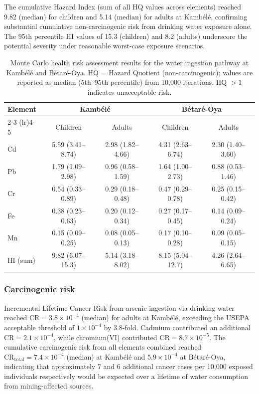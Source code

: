 \documentclass[preprint,12pt,authoryear]{elsarticle}
\begin{document}
The cumulative Hazard Index (sum of all HQ values across elements) reached 9.82 (median) for children and 5.14 (median) for adults at Kamb\'{e}l\'{e}, confirming substantial cumulative non-carcinogenic risk from drinking water exposure alone. The 95th percentile HI values of 15.3 (children) and 8.2 (adults) underscore the potential severity under reasonable worst-case exposure scenarios.

\begin{table}[h!]
\centering
\caption{Monte Carlo health risk assessment results for the water ingestion pathway at Kamb\'{e}l\'{e} and B\'{e}tar\'{e}-Oya. HQ = Hazard Quotient (non-carcinogenic); values are reported as median (5th--95th percentile) from 10,000 iterations. HQ $> 1$ indicates unacceptable risk.}
\label{tab:hq}
\small
\begin{tabular}{lcccc}
\toprule
\multirow{2}{*}{Element} & \multicolumn{2}{c}{Kamb\'{e}l\'{e}} & \multicolumn{2}{c}{B\'{e}tar\'{e}-Oya} \\
\cmidrule(lr){2-3} \cmidrule(lr){4-5}
& Children & Adults & Children & Adults \\
\midrule
Cd & 5.59 (3.41--8.74) & 2.98 (1.82--4.66) & 4.31 (2.63--6.74) & 2.30 (1.40--3.60) \\
Pb & 1.79 (1.09--2.98) & 0.96 (0.58--1.59) & 1.64 (1.00--2.73) & 0.88 (0.53--1.46) \\
Cr & 0.54 (0.33--0.89) & 0.29 (0.18--0.48) & 0.47 (0.29--0.78) & 0.25 (0.15--0.42) \\
Fe & 0.38 (0.23--0.63) & 0.20 (0.12--0.34) & 0.27 (0.17--0.45) & 0.14 (0.09--0.24) \\
Mn & 0.15 (0.09--0.25) & 0.08 (0.05--0.13) & 0.17 (0.10--0.28) & 0.09 (0.05--0.15) \\
\midrule
HI (sum) & 9.82 (6.07--15.3) & 5.14 (3.18--8.02) & 8.15 (5.04--12.7) & 4.26 (2.64--6.65) \\
\bottomrule
\end{tabular}
\end{table}

\subsubsection{Carcinogenic risk}

Incremental Lifetime Cancer Risk from arsenic ingestion via drinking water reached $\text{CR} = 3.8 \times 10^{-4}$ (median) for adults at Kamb\'{e}l\'{e}, exceeding the USEPA acceptable threshold of $1 \times 10^{-4}$ by 3.8-fold. Cadmium contributed an additional $\text{CR} = 2.1 \times 10^{-4}$, while chromium(VI) contributed $\text{CR} = 8.7 \times 10^{-5}$. The cumulative carcinogenic risk from all elements combined reached $\text{CR}_\text{total} = 7.4 \times 10^{-4}$ (median) at Kamb\'{e}l\'{e} and $5.9 \times 10^{-4}$ at B\'{e}tar\'{e}-Oya, indicating that approximately 7 and 6 additional cancer cases per 10,000 exposed individuals respectively would be expected over a lifetime of water consumption from mining-affected sources.
\end{document}
